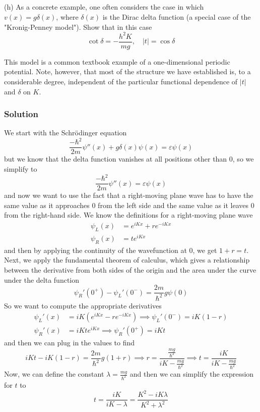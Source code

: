 \documentclass[12pt]{article}
\begin{document}
\subsection{}

(h) As a concrete example, one often considers the case in which $v(x)=g \delta(x)$, where $\delta(x)$ is the Dirac delta function (a special case of the "Kronig-Penney model"). Show that in this case
$$
\cot \delta=-\frac{h^2 K}{m g}, \quad|t|=\cos \delta
$$

This model is a common textbook example of a one-dimensional periodic potential. Note, however, that most of the structure we have established is, to a considerable degree, independent of the particular functional dependence of $|t|$ and $\delta$ on $K$.

\subsubsection{Solution}
We start with the Schrödinger equation
\begin{equation}
    \frac{-\hbar^2}{2m} \psi''(x) + g\delta(x)\psi(x) = \varepsilon\psi(x)
\end{equation}
but we know that the delta function vanishes at all positions other than 0, so we simplify to
\begin{equation}
    \frac{-\hbar^2}{2m} \psi''(x) = \varepsilon\psi(x)
\end{equation}
and now we want to use the fact that a right-moving plane wave has to have the same value as it approaches 0 from the left side and the same value as it leaves 0 from the right-hand side. We know the definitions for a right-moving plane wave
\begin{align}
    \psi_L(x) &= e^{iKx} + re^{-iKx} \\
    \psi_R(x) &= te^{iKx}
\end{align}
and then by applying the continuity of the wavefunction at 0, we get $1+r=t$. Next, we apply the fundamental theorem of calculus, which gives a relationship between the derivative from both sides of the origin and the area under the curve under the delta function
\begin{equation}
    \psi_R'(0^+) - \psi_L'(0^-) = \frac{2m}{\hbar^2}g\psi(0)
\end{equation}
So we want to compute the appropriate derivatives
\begin{align}
    \psi_L'(x) &= iK\left(e^{iKx} - re^{-iKx}\right) \implies \psi_L'(0^-) = iK(1 - r) \\
    \psi_R'(x) &= iKt e^{iKx} \implies \psi_R'(0^+) = iKt
\end{align}
and then we can plug in the values to find
\begin{equation}
    iKt - iK(1 - r) = \frac{2m}{\hbar^2}g(1 + r) \implies r = \frac{\frac{mg}{\hbar^{2}}}{iK - \frac{mg}{\hbar^2}} \implies t = \frac{iK}{iK - \frac{mg}{\hbar^2}}
\end{equation}
Now, we can define the constant $\lambda = \frac{mg}{\hbar^2}$ and then we can simplify the expression for $t$ to
\begin{equation}
    t = \frac{iK}{iK - \lambda} = \frac{K^2 - iK\lambda}{K^2 + \lambda^2}
\end{equation}
\end{document}
